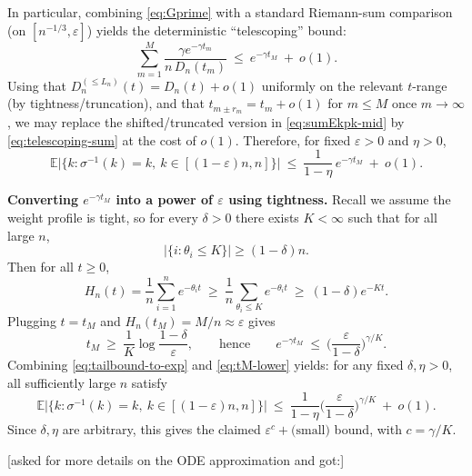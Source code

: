 \documentclass[10pt]{article}
\newcommand{\mscomment}[1]{\textup{\textsf{\color{red}[#1]}}}
\numberwithin{equation}{section}
\begin{document}
In particular, combining \eqref{eq:Gprime} with a standard Riemann-sum comparison (on $[n^{-1/3},\varepsilon]$)
yields the deterministic ``telescoping'' bound:
\begin{equation}\label{eq:telescoping-sum}
\sum_{m=1}^{M}\frac{\gamma e^{-\gamma t_m}}{n\,D_n(t_m)}
\ \le\ e^{-\gamma t_M}\ +\ o(1).
\end{equation}
Using that $D_n^{(\le L_n)}(t)=D_n(t)+o(1)$ uniformly on the relevant $t$-range (by tightness/truncation),
and that $t_{m\pm r_m}=t_m+o(1)$ for $m\le M$ once $m\to\infty$, we may replace the shifted/truncated
version in \eqref{eq:sumEkpk-mid} by \eqref{eq:telescoping-sum} at the cost of $o(1)$.
Therefore, for fixed $\varepsilon>0$ and $\eta>0$,
\begin{equation}\label{eq:tailbound-to-exp}
\mathbb E\big|\{k:\sigma^{-1}(k)=k,\ k\in[(1-\varepsilon)n,n]\}\big|
\ \le\ \frac{1}{1-\eta}\,e^{-\gamma t_M}\ +\ o(1).
\end{equation}

\textbf{Converting $e^{-\gamma t_M}$ into a power of $\varepsilon$ using tightness.}
Recall we assume the weight profile is tight, so for every $\delta>0$ there exists $K<\infty$
such that for all large $n$,
\begin{equation}\label{eq:tightness-K}
\big|\{i:\theta_i\le K\}\big|\ge (1-\delta)n.
\end{equation}
Then for all $t\ge0$,
\[
H_n(t)=\frac1n\sum_{i=1}^n e^{-\theta_i t}\ \ge\ \frac1n\sum_{\theta_i\le K} e^{-\theta_i t}
\ \ge\ (1-\delta)e^{-Kt}.
\]
Plugging $t=t_M$ and $H_n(t_M)=M/n\approx\varepsilon$ gives
\begin{equation}\label{eq:tM-lower}
t_M \ \ge\ \frac1K\log\frac{1-\delta}{\varepsilon},
\qquad\text{hence}\qquad
e^{-\gamma t_M}\ \le\ \Big(\frac{\varepsilon}{1-\delta}\Big)^{\gamma/K}.
\end{equation}
Combining \eqref{eq:tailbound-to-exp} and \eqref{eq:tM-lower} yields:
for any fixed $\delta,\eta>0$, all sufficiently large $n$ satisfy
\begin{equation}\label{eq:tail-final}
\mathbb E\big|\{k:\sigma^{-1}(k)=k,\ k\in[(1-\varepsilon)n,n]\}\big|
\ \le\ \frac{1}{1-\eta}\Big(\frac{\varepsilon}{1-\delta}\Big)^{\gamma/K}\ +\ o(1).
\end{equation}
Since $\delta,\eta$ are arbitrary, this gives the claimed $\varepsilon^c+\text{(small)}$ bound,
with $c=\gamma/K$.


\mscomment{asked for more details on the ODE approximation and got:}
\end{document}
